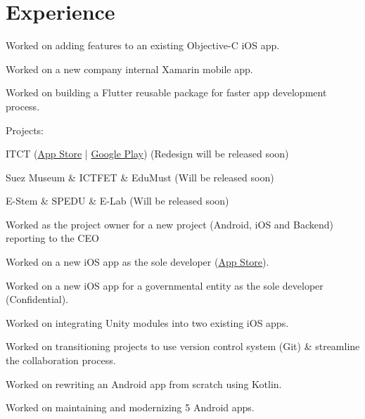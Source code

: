 \documentclass[]{Resume}
\begin{document}
\hfill
\begin{minipage}[t]{0.63\textwidth} 


\section{Experience}

\vspace{\topsep} %
\begin{tightemize}
\item Worked on adding features to an existing Objective-C iOS app.
\item Worked on a new company internal Xamarin mobile app.
\item Worked on building a Flutter reusable package for faster app development process.
\end{tightemize}
\sectionsep

Projects:\\
\begin{tightemize}
\item ITCT (\href{https://apps.apple.com/eg/app/itct/id1457627257}{App Store} | \href{https://play.google.com/store/apps/details?id=com.asugards.itct}{Google Play}) (Redesign will be released soon)
\item Suez Museum \& ICTFET \& EduMust (Will be released soon)
\item E-Stem \& SPEDU \& E-Lab (Will be released soon)
\end{tightemize}
\sectionsep

\begin{tightemize}
\item Worked as the project owner for a new project (Android, iOS and Backend) reporting to the CEO
\item Worked on a new iOS app as the sole developer (\href{http://apps.apple.com/eg/app/ritmo/id1366842426}{App Store}).
\item Worked on a new iOS app for a governmental entity as the sole developer (Confidential).
\item Worked on integrating Unity modules into two existing iOS apps.
\item Worked on transitioning projects to use version control system (Git) \& streamline the collaboration process.
\item Worked on rewriting an Android app from scratch using Kotlin.
\item Worked on maintaining and modernizing 5 Android apps.
\end{tightemize}
\sectionsep


\end{minipage}
\end{document}
